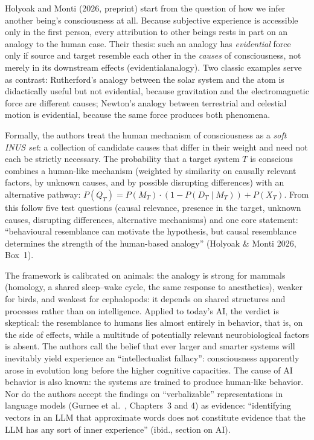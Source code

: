 \documentclass[acmlarge, nonacm]{acmart}
\begin{document}
Holyoak and Monti (2026, preprint) \cite{holyoakmonti2026} start from the question of how we infer another being's consciousness at all. Because subjective experience is accessible only in the first person, every attribution to other beings rests in part on an analogy to the human case. Their thesis: such an analogy has \textit{evidential} force only if source and target resemble each other in the \textit{causes} of consciousness, not merely in its downstream effects (\gls{evidentialanalogy}). Two classic examples serve as contrast: Rutherford's analogy between the solar system and the atom is didactically useful but not evidential, because gravitation and the electromagnetic force are different causes; Newton's analogy between terrestrial and celestial motion is evidential, because the same force produces both phenomena.

Formally, the authors treat the human mechanism of consciousness as a \textit{soft INUS set}: a collection of candidate causes that differ in their weight and need not each be strictly necessary. The probability that a target system $T$ is conscious combines a human-like mechanism (weighted by similarity on causally relevant factors, by unknown causes, and by possible disrupting differences) with an alternative pathway: $P(Q_T) = P(M_T) \cdot (1 - P(D_T \mid M_T)) + P(X_T)$. From this follow five test questions (causal relevance, presence in the target, unknown causes, disrupting differences, alternative mechanisms) and one core statement: ``behavioural resemblance can motivate the hypothesis, but causal resemblance determines the strength of the human-based analogy'' (Holyoak \& Monti 2026, Box~1).

The framework is calibrated on animals: the analogy is strong for mammals (homology, a shared sleep--wake cycle, the same response to anesthetics), weaker for birds, and weakest for cephalopods: it depends on shared structures and processes rather than on intelligence. Applied to today's AI, the verdict is skeptical: the resemblance to humans lies almost entirely in behavior, that is, on the side of effects, while a multitude of potentially relevant neurobiological factors is absent. The authors call the belief that ever larger and smarter systems will inevitably yield experience an ``intellectualist fallacy'': consciousness apparently arose in evolution long before the higher cognitive capacities. The cause of AI behavior is also known: the systems are trained to produce human-like behavior. Nor do the authors accept the findings on ``verbalizable'' representations in language models (Gurnee et al.\ \cite{gurnee2026}, Chapters~3 and 4) as evidence: ``identifying vectors in an LLM that approximate words does not constitute evidence that the LLM has any sort of inner experience'' (ibid., section on AI).
\end{document}
